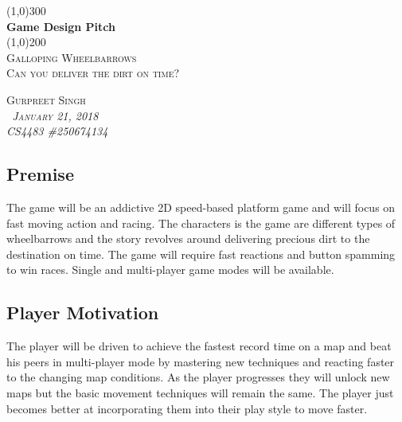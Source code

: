 \documentclass[12pt,]{article}
\begin{document}
\doublespacing

\begin{titlepage}
    \begin{center}
    \line(1,0){300} \\ 
    [0.25in]
    \huge{\bfseries Game Design Pitch} \\
    [2mm]
    \line(1,0){200} \\
    [1.5cm] 
    \textsc{\Large Galloping Wheelbarrows} \\
    [0.75cm]
    \textsc{\Large Can you deliver the dirt on time?} \\
    [9cm]
    \end{center}
    
    \begin{flushright}
    \textsc{\Large{Gurpreet Singh \\}\normalsize\emph{\ January 21, 2018 \\}\normalsize\emph{CS4483 \#250674134 \\} }
    
    \end{flushright}
    
\end{titlepage}

\newpage

\hypertarget{premise}{%
\subsection{Premise}\label{premise}}

The game will be an addictive 2D speed-based platform game and will
focus on fast moving action and racing. The characters is the game are
different types of wheelbarrows and the story revolves around delivering
precious dirt to the destination on time. The game will require fast
reactions and button spamming to win races. Single and multi-player game
modes will be available.

\hypertarget{player-motivation}{%
\subsection{Player Motivation}\label{player-motivation}}

The player will be driven to achieve the fastest record time on a map
and beat his peers in multi-player mode by mastering new techniques and
reacting faster to the changing map conditions. As the player progresses
they will unlock new maps but the basic movement techniques will remain
the same. The player just becomes better at incorporating them into
their play style to move faster.
\end{document}
